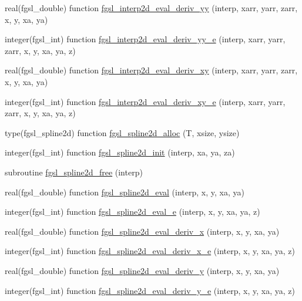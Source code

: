\begin{DoxyCompactItemize}
\item 
real(fgsl\+\_\+double) function \hyperlink{interp_8finc_ae944fb9ca53596b14548373169172c0a}{fgsl\+\_\+interp2d\+\_\+eval\+\_\+deriv\+\_\+yy} (interp, xarr, yarr, zarr, x, y, xa, ya)
\item 
integer(fgsl\+\_\+int) function \hyperlink{interp_8finc_a45f91534629f458ec3a7b8a3f9282239}{fgsl\+\_\+interp2d\+\_\+eval\+\_\+deriv\+\_\+yy\+\_\+e} (interp, xarr, yarr, zarr, x, y, xa, ya, z)
\item 
real(fgsl\+\_\+double) function \hyperlink{interp_8finc_ab484bb684949af39a86efee3c90a5b12}{fgsl\+\_\+interp2d\+\_\+eval\+\_\+deriv\+\_\+xy} (interp, xarr, yarr, zarr, x, y, xa, ya)
\item 
integer(fgsl\+\_\+int) function \hyperlink{interp_8finc_ac909867bb9ca084f64a2099ebcf3b371}{fgsl\+\_\+interp2d\+\_\+eval\+\_\+deriv\+\_\+xy\+\_\+e} (interp, xarr, yarr, zarr, x, y, xa, ya, z)
\item 
type(fgsl\+\_\+spline2d) function \hyperlink{interp_8finc_a6f9e694057a42d64f1e6e7ca1feb780f}{fgsl\+\_\+spline2d\+\_\+alloc} (T, xsize, ysize)
\item 
integer(fgsl\+\_\+int) function \hyperlink{interp_8finc_a65c88bc2ee823eac468514f1bfabec2c}{fgsl\+\_\+spline2d\+\_\+init} (interp, xa, ya, za)
\item 
subroutine \hyperlink{interp_8finc_aee427c431ed444477cdb4a8bec8a32f9}{fgsl\+\_\+spline2d\+\_\+free} (interp)
\item 
real(fgsl\+\_\+double) function \hyperlink{interp_8finc_a4759d8d5a7405c8bdd000ed2a8d56fcb}{fgsl\+\_\+spline2d\+\_\+eval} (interp, x, y, xa, ya)
\item 
integer(fgsl\+\_\+int) function \hyperlink{interp_8finc_a64ae4fd2df3f628716f2a247532ec06d}{fgsl\+\_\+spline2d\+\_\+eval\+\_\+e} (interp, x, y, xa, ya, z)
\item 
real(fgsl\+\_\+double) function \hyperlink{interp_8finc_afdfe485de4a02abafbd992bed4b00e58}{fgsl\+\_\+spline2d\+\_\+eval\+\_\+deriv\+\_\+x} (interp, x, y, xa, ya)
\item 
integer(fgsl\+\_\+int) function \hyperlink{interp_8finc_a15ef9e6648b89709d30a042d21356e70}{fgsl\+\_\+spline2d\+\_\+eval\+\_\+deriv\+\_\+x\+\_\+e} (interp, x, y, xa, ya, z)
\item 
real(fgsl\+\_\+double) function \hyperlink{interp_8finc_a0ff8f4a8b587cf8d2b947ee9dedd6866}{fgsl\+\_\+spline2d\+\_\+eval\+\_\+deriv\+\_\+y} (interp, x, y, xa, ya)
\item 
integer(fgsl\+\_\+int) function \hyperlink{interp_8finc_a68d0bb0069c9dacc5ca8da0b71c823a1}{fgsl\+\_\+spline2d\+\_\+eval\+\_\+deriv\+\_\+y\+\_\+e} (interp, x, y, xa, ya, z)

\end{DoxyCompactItemize}
